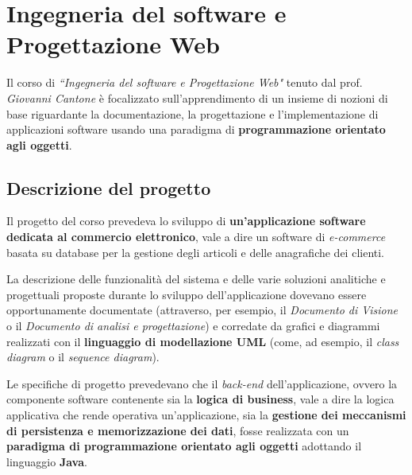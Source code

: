 \documentclass[10pt,a4paper, titlepage]{article}
\begin{document}
\begin{frontespizio} 
\end{frontespizio} 

\tableofcontents


\newpage
\section{Ingegneria del software e Progettazione Web}

Il corso di \textit{``Ingegneria del software e Progettazione Web"} tenuto dal prof. \textit{Giovanni Cantone} è focalizzato sull'apprendimento di un insieme di nozioni di base riguardante la documentazione, la progettazione e l'implementazione di applicazioni software usando una paradigma di \textbf{programmazione orientato agli oggetti}.

\subsection{Descrizione del progetto}

Il progetto del corso prevedeva lo sviluppo di \textbf{un'applicazione software dedicata al commercio elettronico}, vale a dire un software di \textit{e-commerce} basata su database per la gestione degli articoli e delle anagrafiche dei clienti.

La descrizione delle funzionalità del sistema e delle varie soluzioni analitiche e progettuali proposte durante lo sviluppo dell'applicazione dovevano essere opportunamente documentate (attraverso, per esempio, il \textit{Documento di Visione} o il \textit{Documento di analisi e progettazione}) e corredate da grafici e diagrammi realizzati con il \textbf{linguaggio di modellazione UML} (come, ad esempio, il \textit{class diagram} o il \textit{sequence diagram}).

Le specifiche di progetto prevedevano che il \textit{back-end} dell'applicazione, ovvero la componente software contenente sia la \textbf{logica di business}, vale a dire la logica applicativa che rende operativa un'applicazione, sia la \textbf{gestione dei meccanismi di persistenza e memorizzazione dei dati}, fosse realizzata con un \textbf{paradigma di programmazione orientato agli oggetti} adottando il linguaggio \textbf{Java}.
\end{document}
